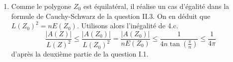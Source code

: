 \begin{enumerate}
\begin{enumerate}
 \item Comme le polygone $Z_0$ est équilatéral, il réalise un cas d'égalité dans la formule de Cauchy-Schwarz de la question II.3. On en déduit que $L(Z_0)^2=nE(Z_0)$. Utilisons alors l'inégalité de 4.c.
\begin{displaymath}
 \frac{|A(Z)|}{L(Z)^2} 
\leq \frac{|A(Z_0)|}{L(Z_0)^2}
= \frac{|A(Z_0)|}{nE(Z_0)}\leq \frac{1}{4n\tan\left(\frac{\pi}{n} \right) }
\leq \frac{1}{4\pi}
\end{displaymath}
d'après la deuxième partie de la question I.1.
\end{enumerate}
\end{enumerate}
